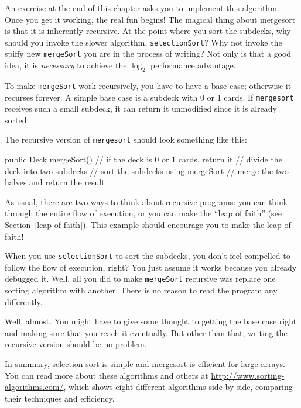 \documentclass[12pt]{book}
\theoremstyle{exercise}
\newcommand{\java}[1]{\verb"#1"}
\newcommand{\java}[1]{\lstinline{#1}} %
\begin{document}
An exercise at the end of this chapter asks you to implement this algorithm.
Once you get it working, the real fun begins!
The magical thing about mergesort is that it is inherently recursive.
At the point where you sort the subdecks, why should you invoke the slower algorithm, \java{selectionSort}?
Why not invoke the spiffy new \java{mergeSort} you are in the process of writing?
Not only is that a good idea, it is {\em necessary} to achieve the $\log_2$ performance advantage.

To make \java{mergeSort} work recursively, you have to have a base case; otherwise it recurses forever.
A simple base case is a subdeck with 0 or 1 cards.
If \java{mergesort} receives such a small subdeck, it can return it unmodified since it is already sorted.

The recursive version of \java{mergesort} should look something like this:

\begin{code}
public Deck mergeSort() {
    // if the deck is 0 or 1 cards, return it
    // divide the deck into two subdecks
    // sort the subdecks using mergeSort
    // merge the two halves and return the result
}
\end{code}


As usual, there are two ways to think about recursive programs: you can think through the entire flow of execution, or you can make the ``leap of faith'' (see Section~\ref{leap of faith}).
This example should encourage you to make the leap of faith!

When you use \java{selectionSort} to sort the subdecks, you don't feel compelled to follow the flow of execution, right?
You just assume it works because you already debugged it.
Well, all you did to make \java{mergeSort} recursive was replace one sorting algorithm with another.
There is no reason to read the program any differently.

Well, almost.  You might have to give some thought to getting the base case right and making sure that you reach it eventually.
But other than that, writing the recursive version should be no problem.

In summary, selection sort is simple and mergesort is efficient for large arrays.
You can read more about these algorithms and others at \url{http://www.sorting-algorithms.com/}, which shows eight different algorithms side by side, comparing their techniques and efficiency.
\end{document}
